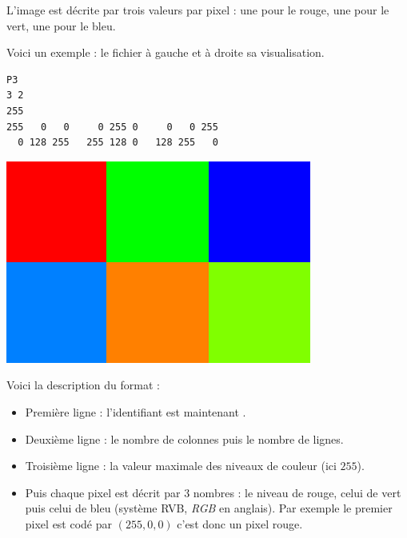 \documentclass[11pt,class=report,crop=false]{standalone}
\begin{document}
\begin{cours}
L'image est décrite par trois valeurs par pixel : une pour le rouge, une pour le vert, une pour le bleu.

Voici un exemple : le fichier  à gauche et à droite sa visualisation.
\begin{center}
\begin{minipage}{0.6\textwidth}
\begin{lstlisting}
P3
3 2
255
255   0   0     0 255 0     0   0 255
  0 128 255   255 128 0   128 255   0
\end{lstlisting}
\end{minipage}
\begin{minipage}{0.3\textwidth}
\includegraphics[scale=0.2]{ecran-cours-image_coul}
\end{minipage}
\end{center}

Voici la description du format :
\begin{itemize}
  \item Première ligne : l'identifiant est maintenant .
  \item Deuxième ligne : le nombre de colonnes puis le nombre de lignes.
  \item Troisième ligne : la valeur maximale des niveaux de couleur (ici $255$).
  \item Puis chaque pixel est décrit par $3$ nombres : le niveau de rouge, celui de vert puis celui de bleu (système RVB, \emph{RGB} en anglais). Par exemple le premier pixel est codé par $(255,0,0)$ c'est donc un pixel rouge.
\end{itemize} 


\end{cours}


\end{document}
